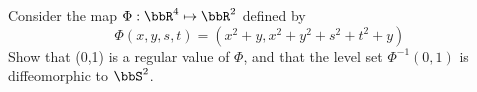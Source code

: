 Consider the map $\Phi:\bbR^4\mapsto\bbR^2$ defined by
\begin{equation*}
\Phi(x,y,s,t) = (x^2 + y, x^2 + y^2 + s^2 + t^2 + y)
\end{equation*}
Show that (0,1) is a regular value of $\Phi$, and that the level set $\Phi^{-1}(0,1)$ is diffeomorphic to $\bbS^2$.